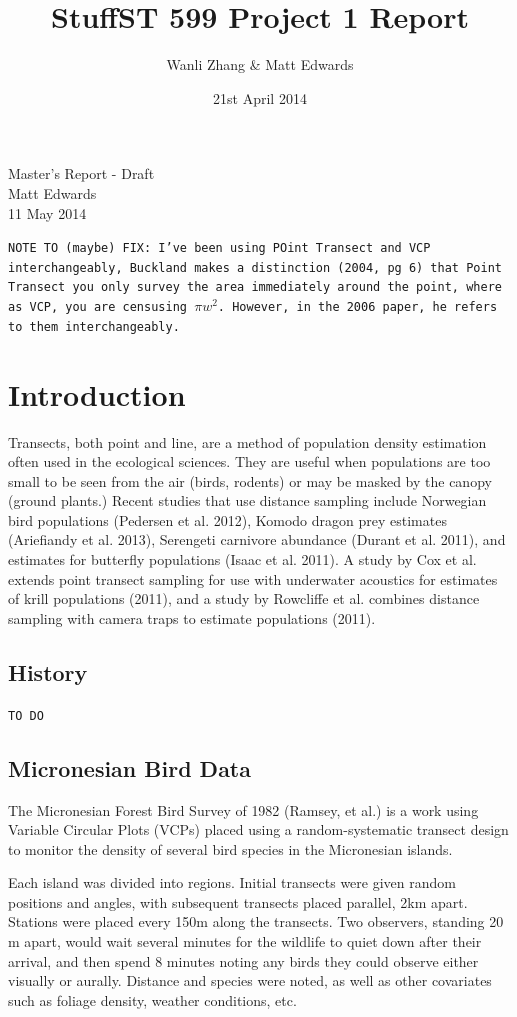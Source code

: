 \documentclass[12pt]{article}
\title{\vspace{-2.0cm}Stuff}
\title{ST 599 Project 1 Report}
\author{Wanli Zhang \& Matt Edwards}
\date{21st April 2014}
\begin{document}
\begingroup  
  \centering
  \LARGE Master's Report - Draft\\[1em]
  \large Matt Edwards\\
  11 May 2014\par
\endgroup
\texttt{NOTE TO (maybe) FIX: I've been using POint Transect and VCP interchangeably, Buckland makes a distinction (2004, pg 6) that Point Transect you only survey the area immediately around the point, where as VCP, you are censusing $\pi w^2$. However, in the 2006 paper, he refers to them interchangeably.}
\section{Introduction}
Transects, both point and line, are a method of population density estimation often used in the ecological sciences. They are useful when populations are too small to be seen from the air (birds, rodents) or may be masked by the canopy (ground plants.) Recent studies that use distance sampling include Norwegian bird populations (Pedersen et al. 2012), Komodo dragon prey estimates (Ariefiandy et al. 2013), Serengeti carnivore abundance (Durant et al. 2011), and estimates for butterfly populations (Isaac et al. 2011). A study by Cox et al. extends point transect sampling for use with underwater acoustics for estimates of krill populations (2011), and a study by Rowcliffe et al. combines distance sampling with camera traps to estimate populations (2011). 

\subsection{History}
\texttt{TO DO}

\subsection{Micronesian Bird Data}
The Micronesian Forest Bird Survey of 1982 (Ramsey, et al.) is a work using Variable Circular Plots (VCPs) placed using a random-systematic transect design to monitor the density of several bird species in the Micronesian islands.

Each island was divided into regions. Initial transects were given random positions and angles, with subsequent transects placed parallel, 2km apart. Stations were placed every 150m along the transects. Two observers, standing 20 m apart, would wait several minutes for the wildlife to quiet down after their arrival, and then spend 8 minutes noting any birds they could observe either visually or aurally. Distance and species were noted, as well as other covariates such as foliage density, weather conditions, etc. 
\end{document}
